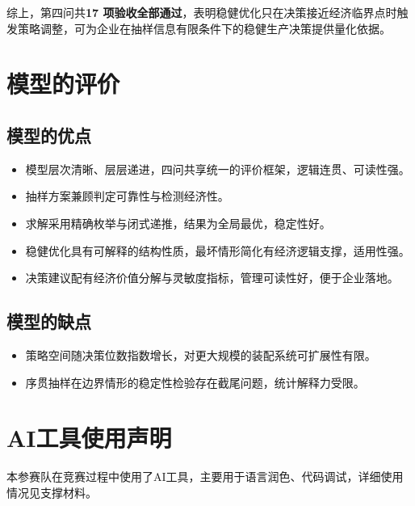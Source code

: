 \documentclass[withoutpreface,bwprint]{cumcmthesis}
\numberwithin{equation}{section}
\begin{document}
综上，第四问共\textbf{17 项验收全部通过}，表明稳健优化只在决策接近经济临界点时触发策略调整，可为企业在抽样信息有限条件下的稳健生产决策提供量化依据。







\section{模型的评价}

\subsection{模型的优点}
\begin{itemize}[itemindent=2em]
\item 模型层次清晰、层层递进，四问共享统一的评价框架，逻辑连贯、可读性强。
\item 抽样方案兼顾判定可靠性与检测经济性。
\item 求解采用精确枚举与闭式递推，结果为全局最优，稳定性好。
\item 稳健优化具有可解释的结构性质，最坏情形简化有经济逻辑支撑，适用性强。
\item 决策建议配有经济价值分解与灵敏度指标，管理可读性好，便于企业落地。
\end{itemize}

\subsection{模型的缺点}
\begin{itemize}[itemindent=2em]
\item 策略空间随决策位数指数增长，对更大规模的装配系统可扩展性有限。
\item 序贯抽样在边界情形的稳定性检验存在截尾问题，统计解释力受限。
\end{itemize}












\section{AI工具使用声明}

本参赛队在竞赛过程中使用了AI工具，主要用于语言润色、代码调试，详细使用情况见支撑材料。
\end{document}
